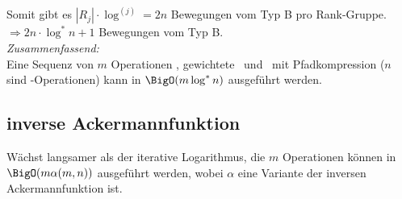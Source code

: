 Somit gibt es $|R_j| \cdot \log^{(j)} = 2n$ Bewegungen vom Typ B pro Rank-Gruppe.\\
$\Rightarrow 2n\cdot \log^{*}n+1$ Bewegungen vom Typ B.\\
\emph{Zusammenfassend:}\\
Eine Sequenz von $m$ Operationen \makeset, gewichtete \union~und \find~mit Pfadkompression ($n$ sind \makeset-Operationen) kann in $\BigO(m\log^{*}n)$ ausgeführt werden.
\subsection{inverse Ackermannfunktion}
Wächst langsamer als der iterative Logarithmus, die $m$ Operationen können in $\BigO(m\alpha(m,n))$ ausgeführt werden, wobei $\alpha$ eine Variante der inversen Ackermannfunktion ist.\\\\